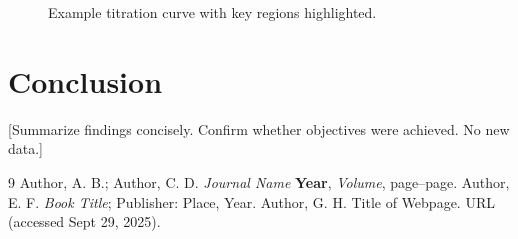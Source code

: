 \begin{figure}[h]
\caption{Example titration curve with key regions highlighted.}
\label{fig:titration-curve}
\end{figure}

\section*{Conclusion}
[Summarize findings concisely. Confirm whether objectives were achieved. No new data.]

\newpage
{}
\begin{thebibliography}{9}
 Author, A. B.; Author, C. D. \textit{Journal Name} \textbf{Year}, \textit{Volume}, page–page.  
 Author, E. F. \textit{Book Title}; Publisher: Place, Year.  
 Author, G. H. Title of Webpage. URL (accessed Sept 29, 2025).
\end{thebibliography}

\LabReportDocumentEnd
